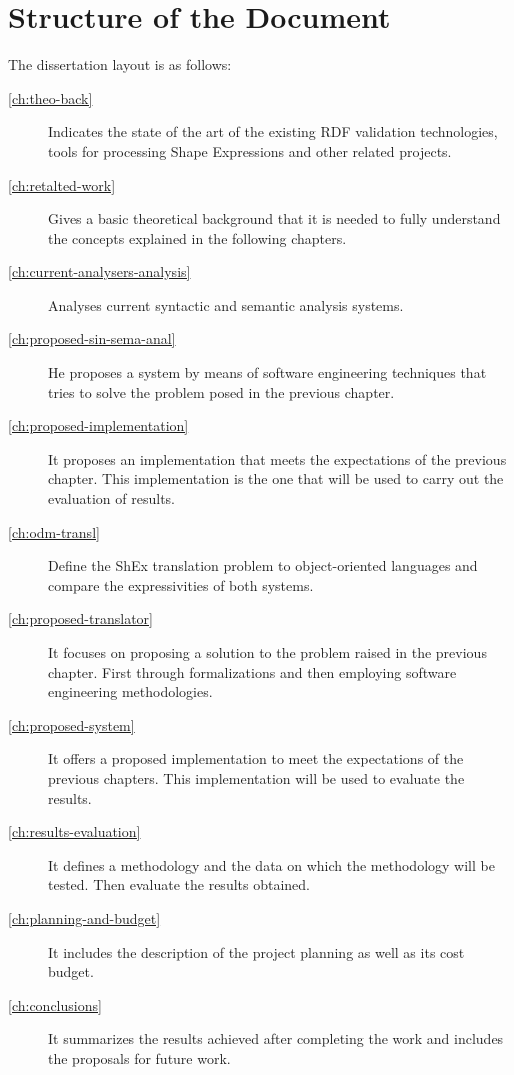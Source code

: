 
\section{Structure of the Document}
\label{sec:intro-structure}
The dissertation layout is as follows:
\bigskip

\begin{description}
  \item[\cref{ch:theo-back}] Indicates the state of the art of the existing RDF validation technologies, tools for processing Shape
  Expressions and other related projects.
	\item[\cref{ch:retalted-work}] Gives a basic theoretical background that it is needed to fully understand the concepts explained in the
  following chapters.
  \item[\cref{ch:current-analysers-analysis}] Analyses current syntactic and semantic analysis systems.
  \item[\cref{ch:proposed-sin-sema-anal}] He proposes a system by means of software engineering techniques
  that tries to solve the problem posed in the previous chapter.
  \item[\cref{ch:proposed-implementation}] It proposes an implementation that meets the expectations of the previous chapter.
  This implementation is the one that will be used to carry out the evaluation of results.
  \item[\cref{ch:odm-transl}] Define the ShEx translation problem to object-oriented languages and compare the
  expressivities of both systems.
  \item[\cref{ch:proposed-translator}] It focuses on proposing a solution to the problem raised in the previous chapter.
  First through formalizations and then employing software engineering methodologies.
  \item[\cref{ch:proposed-system}] It offers a proposed implementation to meet the expectations of the previous chapters.
  This implementation will be used to evaluate the results.
  \item[\cref{ch:results-evaluation}] It defines a methodology and the data on which the methodology will be tested. Then evaluate the results obtained.
  \item[\cref{ch:planning-and-budget}] It includes the description of the project planning as well as its cost budget.
  \item[\cref{ch:conclusions}] It summarizes the results achieved after completing the work and includes the proposals for future work.
\end{description}
